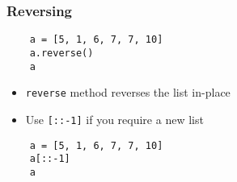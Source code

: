 \begin{frame}[fragile]
  \frametitle{Reversing}
  \begin{lstlisting}
    a = [5, 1, 6, 7, 7, 10]
    a.reverse()
    a
  \end{lstlisting}
  \begin{itemize}
  \item \texttt{reverse} method reverses the list in-place
  \item Use \texttt{[::-1]} if you require a new list
  \end{itemize}
  \begin{lstlisting}
    a = [5, 1, 6, 7, 7, 10]
    a[::-1]
    a
  \end{lstlisting}
\end{frame}
